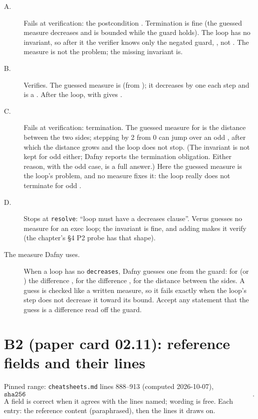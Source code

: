 \documentclass[11pt]{article}
\begin{document}
\begin{description}
\item[A.] Fails at verification: the postcondition . Termination
  is fine (the guessed measure  decreases and is bounded while the
  guard holds). The loop has no invariant, so after it the verifier knows only
  the negated guard, , not . The measure is not the
  problem; the missing invariant is.
\item[B.] Verifies. The guessed measure is  (from ); it
  decreases by one each step and is a . After the loop,
   with  gives .
\item[C.] Fails at verification: termination. The guessed measure for
   is the distance between the two sides; stepping by 2 from 0 can
  jump over an odd , after which the distance grows and the loop does
  not stop. (The invariant  is not kept for odd  either;
  Dafny reports the termination obligation. Either reason, with the odd case,
  is a full answer.) Here the guessed measure is the loop's problem, and no
  measure fixes it: the loop really does not terminate for odd .
\item[D.] Stops at \texttt{resolve}: ``loop must have a decreases clause''.
  Verus guesses no measure for an exec loop; the invariant is fine, and adding
   makes it verify (the chapter's \S4 P2 probe has
  that shape).
\item[The measure Dafny uses.] When a loop has no \texttt{decreases}, Dafny
  guesses one from the guard: for  (or \dfy{<=}) the difference
  , for  the difference , for  the
  distance between the sides. A guess is checked like a written measure, so it
  fails exactly when the loop's step does not decrease it toward its bound.
  Accept any statement that the guess is a difference read off the guard.
\end{description}

\section*{B2 (paper card 02.11): reference fields and their lines}

Pinned range: \texttt{cheatsheets.md} lines 888--913 (computed 2026-10-07),
\[ \texttt{sha256 d9fda575ed350eed76ac951aaca5717f1063acb0f78f146ac4ef1201d74c056a}. \]
A field is correct when it agrees with the lines named; wording is free. Each
entry: the reference content (paraphrased), then the lines it draws on.
\end{document}
